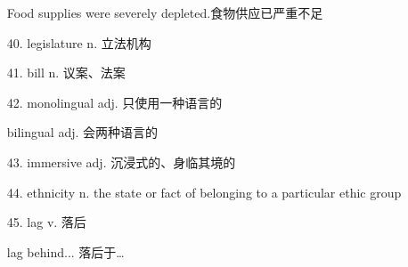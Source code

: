 \begin{multicols}{2}
\begin{itemize}
        Food supplies were severely depleted.食物供应已严重不足
        \item [40.]legislature n. 立法机构
        \item [41.]bill n. 议案、法案
        \item [42.]monolingual adj. 只使用一种语言的
        
        bilingual adj. 会两种语言的
        \item [43.]immersive adj. 沉浸式的、身临其境的
        \item [44.]ethnicity n. the state or fact of 
        belonging to a particular ethic group
        \item [45.]lag v. 落后
        
        lag behind... 落后于\dots
    \end{itemize}
\end{multicols}